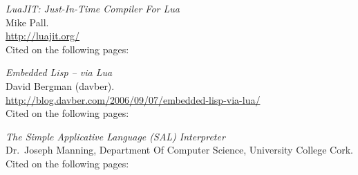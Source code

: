 \begin{thebibliography}{9}
  \emph{LuaJIT: Just-In-Time Compiler For Lua} \\
  Mike Pall. \\
  \url{http://luajit.org/} \\
  Cited on the following pages:

  \emph{Embedded Lisp -- via Lua} \\
  David Bergman (davber). \\
  \url{http://blog.davber.com/2006/09/07/embedded-lisp-via-lua/} \\
  Cited on the following pages: 
  
  \emph{The Simple Applicative Language (SAL) Interpreter} \\
  Dr.\ Joseph Manning,
  Department Of Computer Science,
  University College Cork. \\
  Cited on the following pages: 

\end{thebibliography}
